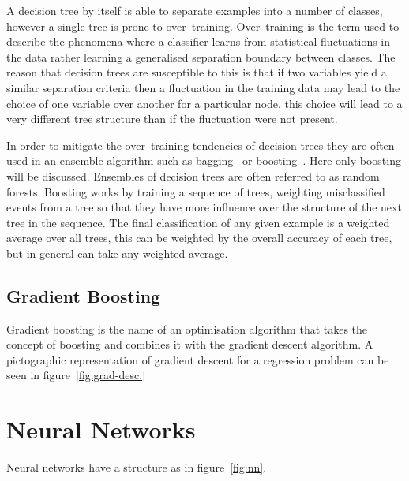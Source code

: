 A decision tree by itself is able to separate examples into a number of classes,
however a single tree is prone to over--training. Over--training is the term
used to describe the phenomena where a classifier learns from statistical
fluctuations in the data rather learning a generalised separation boundary
between classes. The reason that decision trees are susceptible to this is that
if two variables yield a similar separation criteria then a fluctuation in the
training data may lead to the choice of one variable over another for a
particular node, this choice will lead to a very different tree structure than
if the fluctuation were not present.

In order to mitigate the over--training tendencies of decision trees they are
often used in an ensemble algorithm such as bagging~\cite{bagging}
or boosting~\cite{boosting}. Here only boosting will be discussed. Ensembles of
decision trees are often referred to as random forests. Boosting works by
training a sequence of trees, weighting misclassified events from a tree so that
they have more influence over the structure of the next tree in the sequence.
The final classification of any given example is a weighted average over all
trees, this can be weighted by the overall accuracy of each tree, but in general
can take any weighted average.

\subsection{Gradient Boosting}

Gradient boosting is the name of an optimisation algorithm that takes the
concept of boosting and combines it with the gradient descent algorithm. A
pictographic representation of gradient descent for a regression problem can be
seen in figure~\ref{fig:grad-desc.}


\section{Neural Networks}%
\label{sec:neural-networks}
Neural networks have a structure as in figure~\ref{fig:nn}.

